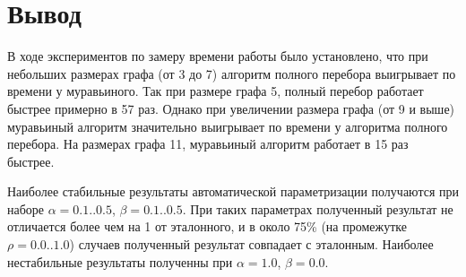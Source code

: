     \section{Вывод}
        В ходе экспериментов по замеру времени работы было установлено, что 
        при небольших размерах графа (от 3 до 7) алгоритм полного перебора 
        выигрывает по времени у муравьиного. 
        Так при размере графа 5, полный перебор работает быстрее примерно в 57 раз.
        Однако при увеличении размера графа (от 9 и выше) муравьиный алгоритм 
        значительно выигрывает по времени у алгоритма полного перебора.
        На размерах графа 11, муравьиный алгоритм работает в 15 раз быстрее.

        Наиболее стабильные результаты автоматической параметризации получаются
        при наборе $\alpha = 0.1..0.5$, $\beta = 0.1..0.5$. 
        При таких параметрах полученный результат не отличается более чем на 1 от эталонного,
        и в около 75\% (на промежутке $\rho = 0.0..1.0$) случаев полученный результат совпадает с эталонным.
        Наиболее нестабильные результаты полученны при $\alpha = 1.0$, $\beta = 0.0$.

\newpage